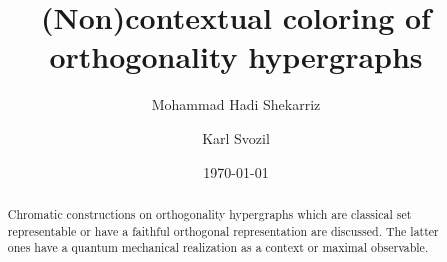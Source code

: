 \documentclass[%
  reprint,
  twocolumn,
 showpacs,
 showkeys,
 preprintnumbers,
 amsmath,amssymb,
 aps,
 pra,
  longbibliography,
 ]{revtex4-1}
\begin{document}
\title{(Non)contextual coloring of orthogonality hypergraphs}

\author{Mohammad Hadi Shekarriz}

\author{Karl Svozil}



\date{\today}

\begin{abstract}
Chromatic constructions on orthogonality hypergraphs which are classical set representable or have a faithful orthogonal representation are discussed. The latter ones have a quantum mechanical realization as a context or maximal observable.
\end{abstract}


\maketitle
\end{document}
